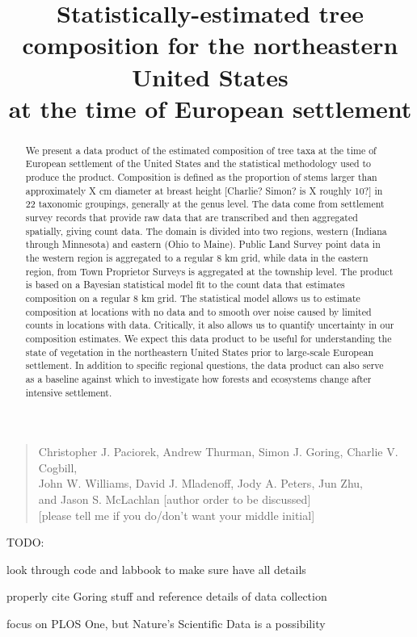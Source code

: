 \documentclass[12pt]{article}\usepackage[]{graphicx}\usepackage[]{color}
\begin{document}
\title{Statistically-estimated tree composition for the northeastern United
States \\
at the time of European settlement}
\maketitle
\begin{quote}
Christopher J. Paciorek, Andrew Thurman, Simon J. Goring, Charlie
V. Cogbill, \\
John W. Williams, David J. Mladenoff, Jody A. Peters, Jun Zhu, \\
and Jason S. McLachlan {[}author order to be discussed{]}\\
{[}please tell me if you do/don't want your middle initial{]}
\end{quote}
TODO:

look through code and labbook to make sure have all details

properly cite Goring stuff and reference details of data collection

focus on PLOS One, but Nature's Scientific Data is a possibility



%
\begin{abstract}
We present a data product of the estimated composition of tree taxa
at the time of European settlement of the United States and the statistical
methodology used to produce the product. Composition is defined as
the proportion of stems larger than approximately X cm diameter at
breast height {[}Charlie? Simon? is X roughly 10?{]} in 22 taxonomic
groupings, generally at the genus level. The data come from settlement
survey records that provide raw data that are transcribed and then
aggregated spatially, giving count data. The domain is divided into
two regions, western (Indiana through Minnesota) and eastern (Ohio
to Maine). Public Land Survey point data in the western region is
aggregated to a regular 8 km grid, while data in the eastern region,
from Town Proprietor Surveys is aggregated at the township level.
The product is based on a Bayesian statistical model fit to the count
data that estimates composition on a regular 8 km grid. The statistical
model allows us to estimate composition at locations with no data
and to smooth over noise caused by limited counts in locations with
data. Critically, it also allows us to quantify uncertainty in our
composition estimates. We expect this data product to be useful for
understanding the state of vegetation in the northeastern United States
prior to large-scale European settlement. In addition to specific
regional questions, the data product can also serve as a baseline
against which to investigate how forests and ecosystems change after
intensive settlement.
\end{abstract}
\end{document}
